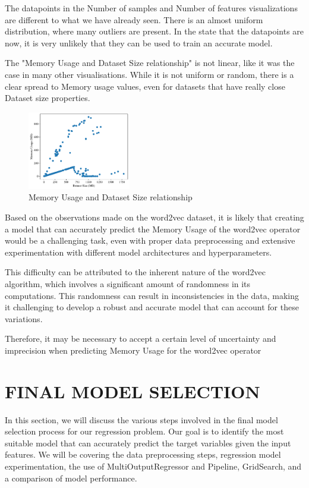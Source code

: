 \documentclass[conference]{IEEEtran}
\begin{document}
The datapoints in the Number of samples and Number of features visualizations are different to what we have already seen. There is an almost uniform distribution, where many outliers are present. In the state that the datapoints are now, it is very unlikely that they can be used to train an accurate model.

The "Memory Usage and Dataset Size relationship" is not linear, like it was the case in many other visualisations. While it is not uniform or random, there is a clear spread to Memory usage values, even for datasets that have really close Dataset size properties.

\begin{figure}[!ht]
    \centering
\includegraphics[width=0.4\textwidth]{plots/experiment_results/word2vec_memory_dataset_size.pdf}
    \caption{Memory Usage and Dataset Size relationship}
\end{figure}

Based on the observations made on the word2vec dataset, it is likely that creating a model that can accurately predict the Memory Usage of the word2vec operator would be a challenging task, even with proper data preprocessing and extensive experimentation with different model architectures and hyperparameters.


This difficulty can be attributed to the inherent nature of the word2vec algorithm, which involves a significant amount of randomness in its computations. This randomness can result in inconsistencies in the data, making it challenging to develop a robust and accurate model that can account for these variations.


Therefore, it may be necessary to accept a certain level of uncertainty and imprecision when predicting Memory Usage for the word2vec operator


\section{FINAL MODEL SELECTION}

In this section, we will discuss the various steps involved in the final model selection process for our regression problem. Our goal is to identify the most suitable model that can accurately predict the target variables given the input features. We will be covering the data preprocessing steps, regression model experimentation, the use of MultiOutputRegressor and Pipeline, GridSearch, and a comparison of model performance.
\end{document}
